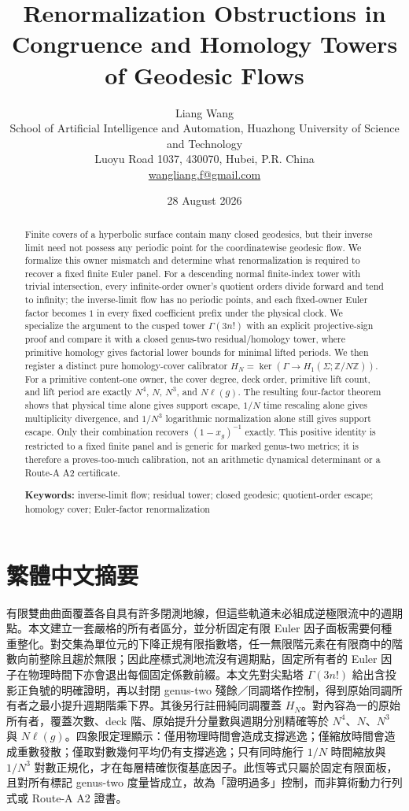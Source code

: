 \documentclass[11pt]{article}
\title{Renormalization Obstructions in Congruence and Homology Towers of Geodesic Flows}
\author{Liang Wang\\[2pt]
\small School of Artificial Intelligence and Automation, Huazhong University of Science and Technology\\
\small Luoyu Road 1037, 430070, Hubei, P.R. China\\
\small \href{mailto:wangliang.f@gmail.com}{wangliang.f@gmail.com}}
\date{28 August 2026}
\theoremstyle{definition}
\theoremstyle{remark}
\begin{document}
\maketitle

\begin{abstract}
Finite covers of a hyperbolic surface contain many closed geodesics, but their inverse limit need not possess any periodic point for the coordinatewise geodesic flow. We formalize this owner mismatch and determine what renormalization is required to recover a fixed finite Euler panel. For a descending normal finite-index tower with trivial intersection, every infinite-order owner's quotient orders divide forward and tend to infinity; the inverse-limit flow has no periodic points, and each fixed-owner Euler factor becomes $1$ in every fixed coefficient prefix under the physical clock. We specialize the argument to the cusped tower $\Gamma(3n!)$ with an explicit projective-sign proof and compare it with a closed genus-two residual/homology tower, where primitive homology gives factorial lower bounds for minimal lifted periods. We then register a distinct pure homology-cover calibrator $H_N=\ker(\Gamma\to H_1(\Sigma;\mathbb Z/N\mathbb Z))$. For a primitive content-one owner, the cover degree, deck order, primitive lift count, and lift period are exactly $N^4$, $N$, $N^3$, and $N\ell(g)$. The resulting four-factor theorem shows that physical time alone gives support escape, $1/N$ time rescaling alone gives multiplicity divergence, and $1/N^3$ logarithmic normalization alone still gives support escape. Only their combination recovers $(1-x_g)^{-1}$ exactly. This positive identity is restricted to a fixed finite panel and is generic for marked genus-two metrics; it is therefore a proves-too-much calibration, not an arithmetic dynamical determinant or a Route-A A2 certificate.

\medskip
\noindent\textbf{Keywords:} inverse-limit flow; residual tower; closed geodesic; quotient-order escape; homology cover; Euler-factor renormalization
\end{abstract}

\section*{繁體中文摘要}
有限雙曲曲面覆蓋各自具有許多閉測地線，但這些軌道未必組成逆極限流中的週期點。本文建立一套嚴格的所有者區分，並分析固定有限 Euler 因子面板需要何種重整化。對交集為單位元的下降正規有限指數塔，任一無限階元素在有限商中的階數向前整除且趨於無限；因此座標式測地流沒有週期點，固定所有者的 Euler 因子在物理時間下亦會退出每個固定係數前綴。本文先對尖點塔 $\Gamma(3n!)$ 給出含投影正負號的明確證明，再以封閉 genus-two 殘餘／同調塔作控制，得到原始同調所有者之最小提升週期階乘下界。其後另行註冊純同調覆蓋 $H_N$。對內容為一的原始所有者，覆蓋次數、deck 階、原始提升分量數與週期分別精確等於 $N^4$、$N$、$N^3$ 與 $N\ell(g)$。四象限定理顯示：僅用物理時間會造成支撐逃逸；僅縮放時間會造成重數發散；僅取對數幾何平均仍有支撐逃逸；只有同時施行 $1/N$ 時間縮放與 $1/N^3$ 對數正規化，才在每層精確恢復基底因子。此恆等式只屬於固定有限面板，且對所有標記 genus-two 度量皆成立，故為「證明過多」控制，而非算術動力行列式或 Route-A A2 證書。
\end{document}
